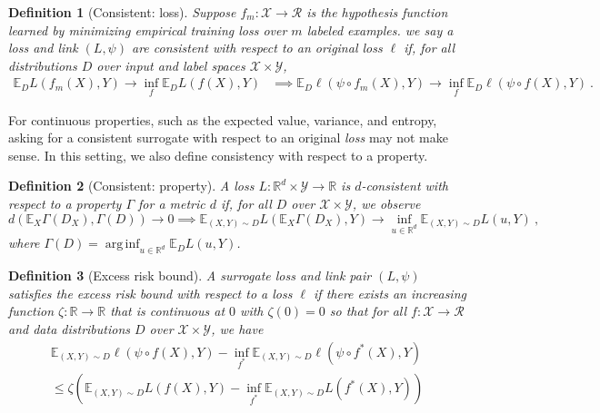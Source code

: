 \documentclass{article}
\newcommand{\reals}{\mathbb{R}}
\newcommand{\E}{\mathbb{E}}
\newcommand{\R}{\mathcal{R}}
\newcommand{\X}{\mathcal{X}}
\newcommand{\Y}{\mathcal{Y}}
\newtheorem{definition}{Definition}
\DeclareMathOperator*{\arginf}{arg\,inf}
\begin{document}
\begin{definition}[Consistent: loss]
	Suppose $f_m : \X \to \R$ is the hypothesis function learned by minimizing empirical training loss over $m$ labeled examples.
	we say a loss and link $(L,\psi)$ are consistent with respect to an original loss $\ell$ if, for all distributions $D$ over input and label spaces $\X \times\Y$, 
	\begin{align*}
	\E_D L(f_m(X), Y) \to \inf_f \E_D L(f(X), Y) &\implies \E_D \ell(\psi \circ f_m(X), Y) \to \inf_f \E_D \ell(\psi \circ f(X), Y)~.~
	\end{align*}
\end{definition}


For continuous properties, such as the expected value, variance, and entropy, asking for a consistent surrogate with respect to an original \emph{loss} may not make sense.
In this setting, we also define consistency with respect to a property. 
\begin{definition}[Consistent: property]
	A loss $L : \reals^d \times \Y \to \reals$ is \emph{$d$-consistent with respect to a property} $\Gamma$ for a metric $d$ if, for all $D$ over $\X \times \Y$,  we observe
\begin{equation}
d(\E_X \Gamma(D_X), \Gamma(D)) \to 0 \implies \E_{(X,Y) \sim D} L(\E_X \Gamma(D_X), Y) \to \inf_{u \in \reals^d} \E_{(X,Y) \sim D} L(u, Y)~,~
\end{equation}
where $\Gamma(D) = \arginf_{u \in \reals^d} \E_D L(u, Y)$.
\end{definition}


\begin{definition}[Excess risk bound]
	A surrogate loss and link pair $(L,\psi)$ satisfies the \emph{excess risk bound} with respect to a loss $\ell$ if there exists an increasing function $\zeta : \reals \to \reals$ that is continuous at $0$ with $\zeta(0) = 0$ so that for all $f:\X \to \R$ and data distributions $D$ over $\X \times \Y$, we have
	\begin{multline}
	\E_{(X,Y) \sim D} \ell(\psi \circ f(X), Y) - \inf_{f^*} \E_{(X,Y) \sim D} \ell(\psi \circ f^*(X), Y) \\ 
	\leq \zeta \left( \E_{(X,Y) \sim D} L(f(X), Y) - \inf_{f^*} \E_{(X,Y) \sim D} L(f^*(X), Y) \right)
	\end{multline}
\end{definition}
\end{document}
